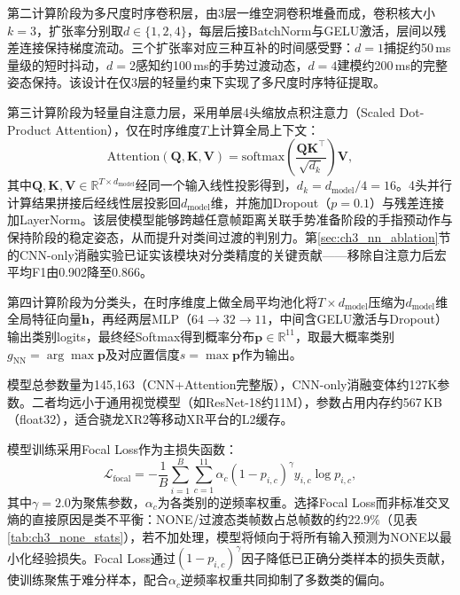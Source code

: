第二计算阶段为多尺度时序卷积层，由3层一维空洞卷积堆叠而成，卷积核大小$k=3$，扩张率分别取$d\in\{1,2,4\}$，每层后接BatchNorm与GELU激活，层间以残差连接保持梯度流动。三个扩张率对应三种互补的时间感受野：$d=1$捕捉约50\,ms量级的短时抖动，$d=2$感知约100\,ms的手势过渡动态，$d=4$建模约200\,ms的完整姿态保持。该设计在仅3层的轻量约束下实现了多尺度时序特征提取。

第三计算阶段为轻量自注意力层，采用单层4头缩放点积注意力（Scaled Dot-Product Attention），仅在时序维度$T$上计算全局上下文：
\begin{equation}
  \mathrm{Attention}(\mathbf{Q},\mathbf{K},\mathbf{V}) = \mathrm{softmax}\!\left(\frac{\mathbf{Q}\mathbf{K}^{\top}}{\sqrt{d_k}}\right)\mathbf{V},
  \label{eq:dbew_nn_attention}
\end{equation}
其中$\mathbf{Q},\mathbf{K},\mathbf{V}\in\mathbb{R}^{T\times d_{\mathrm{model}}}$经同一个输入线性投影得到，$d_k = d_{\mathrm{model}}/4 = 16$。4头并行计算结果拼接后经线性层投影回$d_{\mathrm{model}}$维，并施加Dropout（$p=0.1$）与残差连接加LayerNorm。该层使模型能够跨越任意帧距离关联手势准备阶段的手指预动作与保持阶段的稳定姿态，从而提升对类间过渡的判别力。第\ref{sec:ch3_nn_ablation}节的CNN-only消融实验已证实该模块对分类精度的关键贡献——移除自注意力后宏平均F1由0.902降至0.866。

第四计算阶段为分类头，在时序维度上做全局平均池化将$T\times d_{\mathrm{model}}$压缩为$d_{\mathrm{model}}$维全局特征向量$\mathbf{h}$，再经两层MLP（$64\rightarrow32\rightarrow11$，中间含GELU激活与Dropout）输出类别logits，最终经Softmax得到概率分布$\mathbf{p}\in\mathbb{R}^{11}$，取最大概率类别$g_{\mathrm{NN}}=\arg\max\mathbf{p}$及对应置信度$s=\max\mathbf{p}$作为输出。

模型总参数量为145,163（CNN+Attention完整版），CNN-only消融变体约127K参数。二者均远小于通用视觉模型（如ResNet-18约11M），参数占用内存约567\,KB（float32），适合骁龙XR2等移动XR平台的L2缓存。


模型训练采用Focal Loss\cite{focal_loss_lin2017}作为主损失函数：
\begin{equation}
  \mathcal{L}_{\mathrm{focal}} = -\frac{1}{B}\sum_{i=1}^{B} \sum_{c=1}^{11} \alpha_c (1-p_{i,c})^{\gamma} y_{i,c} \log p_{i,c},
  \label{eq:focal_loss}
\end{equation}
其中$\gamma=2.0$为聚焦参数，$\alpha_c$为各类别的逆频率权重。选择Focal Loss而非标准交叉熵的直接原因是类不平衡：NONE/过渡态类帧数占总帧数的约22.9\%（见表\ref{tab:ch3_none_stats}），若不加处理，模型将倾向于将所有输入预测为NONE以最小化经验损失。Focal Loss通过$(1-p_{i,c})^\gamma$因子降低已正确分类样本的损失贡献，使训练聚焦于难分样本，配合$\alpha_c$逆频率权重共同抑制了多数类的偏向。

